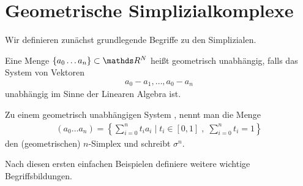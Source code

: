 



% 

\section{Geometrische Simplizialkomplexe}


Wir definieren zunächst grundlegende Begriffe zu den Simplizialen.

\begin{Def}
	Eine Menge $\{ a_0\ldots a_n \} \subset \R^N$ heißt 
	geometrisch unabhängig, falls das System von Vektoren
	\begin{gather*}
		a_0 - a_1 ,  \ldots , a_0 - a_n
	\end{gather*}
	unabhängig im Sinne der Linearen Algebra ist.
\end{Def}


\begin{Def}
	Zu einem geometrisch unabhängigen System \gs, nennt man die Menge
	\begin{gather*}
		(a_0 \ldots a_n) = 
		\left\{ 
			 \sum\limits_{i=0}^n t_i a_i \; \Big| \; %
			 t_i \in [0,1] \; , \;  \sum\limits_{i=0}^n t_i = 1
		\right\}
	\end{gather*}
	den (geometrischen) $n$-Simplex und schreibt $\sigma^n$.
\end{Def}


Nach diesen ersten einfachen Beispielen definiere weitere wichtige 
Begriffsbildungen.

